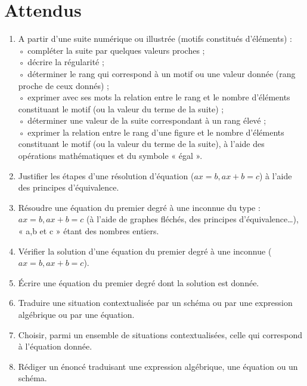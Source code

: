 \documentclass[../../syllabus_1.tex]{subfiles}
\begin{document}
\section*{Attendus}
\begin{enumerate}[label=\textbf{\arabic*.}]
    \item A partir d'une suite numérique ou illustrée (motifs constitués d'éléments) :\\
◦ compléter la suite par quelques valeurs proches ;\\
◦ décrire la régularité ;\\
◦ déterminer le rang qui correspond à un motif ou une valeur donnée (rang proche de ceux donnés) ;\\
◦ exprimer avec ses mots la relation entre le rang et le nombre d'éléments constituant le motif (ou la valeur du terme de la suite) ;\\
◦ déterminer une valeur de la suite correspondant à un rang élevé ;\\
◦ exprimer la relation entre le rang d'une figure et le nombre d'éléments constituant le motif (ou la valeur du terme de la suite), à l'aide des opérations mathématiques et du symbole « égal ».
    \item Justifier les étapes d'une résolution d'équation (\(ax=b, ax+b=c \)) à l'aide des principes d'équivalence.
    \item Résoudre une équation du premier degré à une inconnue du type : \(ax=b, ax+b=c \) (à l'aide de graphes fléchés, des principes d'équivalence…), « a,b et c » étant des nombres entiers.
    \item Vérifier la solution d'une équation du premier degré à une inconnue (\(ax=b, ax+b=c \)).
    \item Écrire une équation du premier degré dont la solution est donnée.
    \item Traduire une situation contextualisée par un schéma ou par une expression algébrique ou par une équation.
    \item Choisir, parmi un ensemble de situations contextualisées, celle qui correspond à l'équation donnée.
    \item Rédiger un énoncé traduisant une expression algébrique, une équation ou un schéma.
\end{enumerate}
\end{document}
